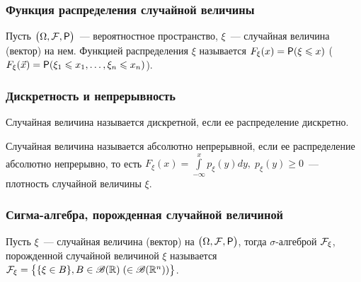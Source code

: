 \subsubsection*{ Функция распределения случайной величины}
\begin{definition}
	Пусть $\big(\Omega, \F, \P\big)$~--- вероятностное пространство, $\xi$~--- случайная величина (вектор) на нем. Функцией распределения $\xi$ называется $F_\xi(x) = \P(\xi \leqslant x)$ ($F_\xi(\vec x) = \P(\xi_1 \leqslant x_1, \ldots, \xi_n \leqslant x_n)$).
\end{definition}
\subsubsection*{ Дискретность и непрерывность}
\begin{definition}
	Случайная величина называется дискретной, если ее распределение дискретно.
\end{definition}
\begin{definition}
	Случайная величина называется абсолютно непрерывной, если ее распределение абсолютно непрерывно, то есть $F_\xi(x) = \int\limits_{-\infty}^xp_\xi(y)dy,\; p_\xi(y) \geqslant 0$~--- плотность случайной величины $\xi$.
\end{definition}
\subsubsection*{ Сигма-алгебра, порожденная случайной величиной}
\begin{definition}
	Пусть $\xi$~--- случайная величина (вектор) на $\big(\Omega, \F, \P\big)$, тогда $\sigma$-алгеброй $\F_\xi$, порожденной случайной величиной $\xi$ называется $\F_\xi = \big\{\{\xi \in B\}, B \in \B(\R)\; (\in \B(\R^n)) \big\}$.
\end{definition}
